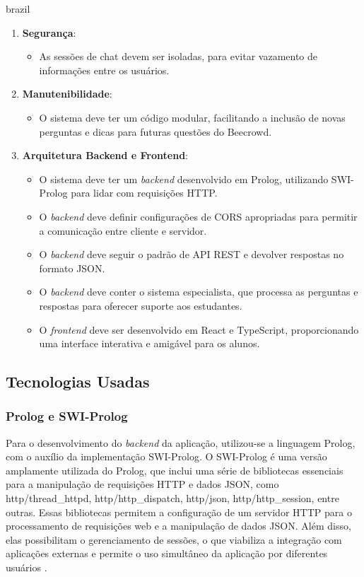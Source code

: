 \begin{otherlanguage*}{brazil}
\begin{enumerate}[label=RNF\arabic* –]
    \item \textbf{Segurança}:
    \begin{itemize}
        \item As sessões de chat devem ser isoladas, para evitar vazamento de informações entre os usuários.
    \end{itemize}
    
    \item \textbf{Manutenibilidade}:
    \begin{itemize}
        \item O sistema deve ter um código modular, facilitando a inclusão de novas perguntas e dicas para futuras questões do Beecrowd.
    \end{itemize}
    
    \item \textbf{Arquitetura Backend e Frontend}:
    \begin{itemize}
        \item O sistema deve ter um \textit{backend} desenvolvido em Prolog, utilizando SWI-Prolog para lidar com requisições HTTP.
        \item O \textit{backend} deve definir configurações de CORS apropriadas para permitir a comunicação entre cliente e servidor.
        \item O \textit{backend} deve seguir o padrão de API REST e devolver respostas no formato JSON.
        \item O \textit{backend} deve conter o sistema especialista, que processa as perguntas e respostas para oferecer suporte aos estudantes.
        \item O \textit{frontend} deve ser desenvolvido em React e TypeScript, proporcionando uma interface interativa e amigável para os alunos.
    \end{itemize}
\end{enumerate}

\subsection{Tecnologias Usadas}

\subsubsection{Prolog e SWI-Prolog}

Para o desenvolvimento do \textit{backend} da aplicação, utilizou-se a linguagem Prolog, com o auxílio da implementação SWI-Prolog. O SWI-Prolog é uma versão amplamente utilizada do Prolog, que inclui uma série de bibliotecas essenciais para a manipulação de requisições HTTP e dados JSON, como http/thread\_httpd, http/http\_dispatch, http/json, http/http\_session, entre outras. Essas bibliotecas permitem a configuração de um servidor HTTP para o processamento de requisições web e a manipulação de dados JSON. Além disso, elas possibilitam o gerenciamento de sessões, o que viabiliza a integração com aplicações externas e permite o uso simultâneo da aplicação por diferentes usuários \cite{swiprologhttp}.


\end{otherlanguage*}

